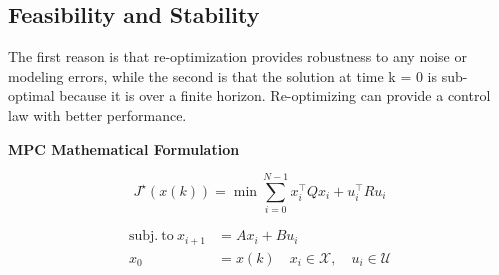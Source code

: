 
\subsection{Feasibility and Stability}

The first reason is that re-optimization provides robustness to any noise or modeling errors,
while the second is that the solution at time k = 0 is sub-optimal because it is over a finite
horizon. Re-optimizing can provide a control law with better performance.

\begin{sstTitleBox}[ForestGreen]{\center\textbf{\large
			MPC Mathematical Formulation
		}
	}

	\begin{sstFrame}[ForestGreen]
		\small
		\color{white}
		\vspace{-1mm}
		\[
			J^\star(x(k))= \min\sum_{i=0}^{N-1}
			x_i^\top Q x_i + u_i^\top R u_i\]
		\vspace{-2mm}
	\end{sstFrame}

	\[\begin{aligned}
			\mathrm{subj.\ to }\   x_{i+1} & = Ax_i + Bu_i \\
			x_0                            & = x(k)
			\quad x_i \in \mathcal{X},
			\quad u_i \in \mathcal{U}
		\end{aligned}\]


\end{sstTitleBox}


%


